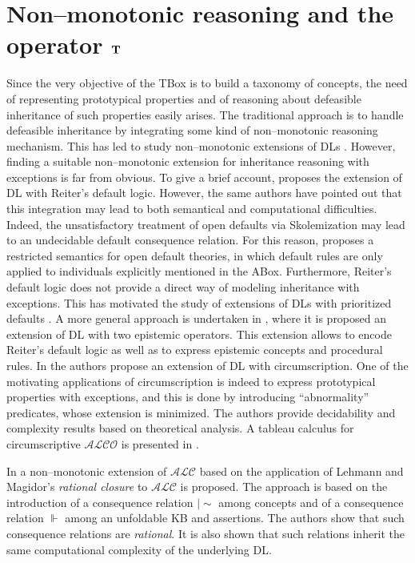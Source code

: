\documentclass[a4paper, 11pt, oneside]{duthesis}
\newcommand {\ent} {\mathrel{{\scriptstyle\mid\!\sim}}}
\newcommand{\tip}{{\bf T}}
\begin{document}
\section{Non--monotonic reasoning and the operator $\tip$}
Since the very objective of the TBox is to build a taxonomy of concepts, the need of representing prototypical properties and of reasoning about defeasible inheritance of such properties easily arises.
The traditional approach is to handle defeasible inheritance by integrating some kind of non--monotonic reasoning mechanism.
This has led to study non--monotonic extensions of DLs \cite{baader95a, baader95b, bonattilutzwolterkr06, casinistraccia2010, donini98, donini2002, eiter2004, straccia93}.
However, finding a suitable non--monotonic extension for inheritance reasoning with exceptions is far from obvious.
To give a brief account, \cite{baader95a} proposes the extension of DL with Reiter's default logic.
However, the same authors have pointed out that this integration may lead to both semantical and computational difficulties.
Indeed, the unsatisfactory treatment of open defaults via Skolemization may lead to an undecidable default consequence relation. For this reason, \cite{baader95a} proposes a restricted semantics for open default theories, in which default rules are only applied to individuals explicitly mentioned in the ABox.
Furthermore, Reiter's default logic does not provide a direct way of modeling inheritance with exceptions.
This has motivated the study of extensions of DLs with prioritized defaults
\cite{straccia93,baader95b}.
A more general approach is undertaken in \cite{donini2002}, where it is proposed an extension of DL with two epistemic operators. This extension allows to encode Reiter's default logic as well as to express epistemic concepts and procedural rules.
In \cite{bonattilutz} the authors propose an extension of DL with circumscription. One of the motivating applications of circumscription is indeed to express prototypical properties with exceptions, and this is done by introducing ``abnormality'' predicates, whose extension is minimized.
The authors provide decidability and complexity results based on theoretical analysis.
A tableau calculus for circumscriptive $\mathcal{ALCO}$ is presented in \cite{hitzlertableau}.

In \cite{casinistraccia2010,stracciaijcai2011} a non--monotonic extension of $\mathcal{ALC}$  based on the application of Lehmann and Magidor's \emph{rational closure} \cite{whatdoes} to $\mathcal{ALC}$ is proposed. The approach is based on the introduction of a consequence relation $\ent$ among concepts and of a consequence relation $\Vdash$ among an unfoldable KB and assertions. The authors show that such consequence relations are \emph{rational}. It is also shown that such relations inherit the same computational complexity of the underlying DL.
\end{document}
